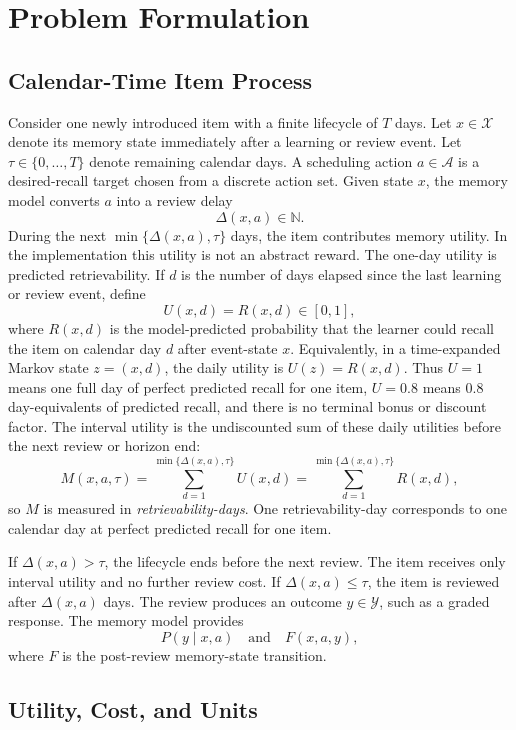 \documentclass[11pt]{article}
\begin{document}
\section{Problem Formulation}

\subsection{Calendar-Time Item Process}

Consider one newly introduced item with a finite lifecycle of \(T\) days. Let \(x\in\mathcal{X}\) denote its memory state immediately after a learning or review event. Let \(\tau\in\{0,\ldots,T\}\) denote remaining calendar days. A scheduling action \(a\in\mathcal{A}\) is a desired-recall target chosen from a discrete action set. Given state \(x\), the memory model converts \(a\) into a review delay
\[
\Delta(x,a)\in\mathbb{N}.
\]
During the next \(\min\{\Delta(x,a),\tau\}\) days, the item contributes memory utility. In the implementation this utility is not an abstract reward. The one-day utility is predicted retrievability. If \(d\) is the number of days elapsed since the last learning or review event, define
\[
U(x,d)=R(x,d)\in[0,1],
\]
where \(R(x,d)\) is the model-predicted probability that the learner could recall the item on calendar day \(d\) after event-state \(x\). Equivalently, in a time-expanded Markov state \(z=(x,d)\), the daily utility is \(U(z)=R(x,d)\). Thus \(U=1\) means one full day of perfect predicted recall for one item, \(U=0.8\) means \(0.8\) day-equivalents of predicted recall, and there is no terminal bonus or discount factor. The interval utility is the undiscounted sum of these daily utilities before the next review or horizon end:
\[
M(x,a,\tau)
=
\sum_{d=1}^{\min\{\Delta(x,a),\tau\}} U(x,d)
=
\sum_{d=1}^{\min\{\Delta(x,a),\tau\}} R(x,d),
\]
so \(M\) is measured in \emph{retrievability-days}. One retrievability-day corresponds to one calendar day at perfect predicted recall for one item.

If \(\Delta(x,a)>\tau\), the lifecycle ends before the next review. The item receives only interval utility and no further review cost. If \(\Delta(x,a)\le \tau\), the item is reviewed after \(\Delta(x,a)\) days. The review produces an outcome \(y\in\mathcal{Y}\), such as a graded response. The memory model provides
\[
P(y\mid x,a)
\quad\text{and}\quad
F(x,a,y),
\]
where \(F\) is the post-review memory-state transition.

\subsection{Utility, Cost, and Units}
\end{document}
